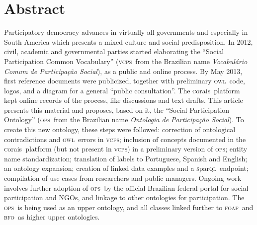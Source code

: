 \documentclass[10pt,letterpaper]{article}
\newcommand{\ops}{\textsc{ops}}
\newcommand{\vcps}{\textsc{vcps}}
\newcommand{\owl}{\textsc{owl}}
\newcommand{\sparql}{\textsc{s}par\textsc{ql}}
\newcommand{\bfo}{\textsc{bfo}}
\newcommand{\foaf}{\textsc{foaf}}
\newcommand{\corais}{\textsc{c}orais}
\begin{document}
\section*{Abstract}
    Participatory democracy advances in virtually all governments and especially in South America which presents a mixed culture and social predisposition.
 In 2012, civil, academic and governmental parties started elaborating the ``Social Participation Common Vocabulary'' (\vcps\ from the Brazilian name \emph{Vocabul\'ario Comum de Participa\c{c}\~ao Social}), as a public and online process. By May 2013, first reference documents were publicized, together with preliminary \owl\ code, logos, and a diagram for a general ``public consultation''.
The \corais\ platform kept online records of the process, like discussions and text drafts. 
This article presents this material and proposes, based on it, the ``Social Participation Ontology'' (\ops\ from the Brazilian name \emph{Ontologia de Participa\c{c}\~ao Social}). To create  this new ontology, these steps were followed: correction of ontological contradictions and \owl\ errors in \vcps; inclusion of concepts documented in the \corais\ platform (but not present in \vcps) in a preliminary version of \ops; entity name standardization; translation of labels to Portuguese, Spanish and English; an ontology expansion; creation of linked data examples and  a \sparql\ endpoint; compilation of use cases from researchers and public managers. Ongoing work involves further adoption of \ops\ by the official Brazilian federal portal for social participation and  NGOs, and linkage to other ontologies for participation. The \ops\ is being used as an upper ontology, and all classes linked further to \foaf\ and \bfo\ as higher upper ontologies.

%
\linenumbers
\end{document}
